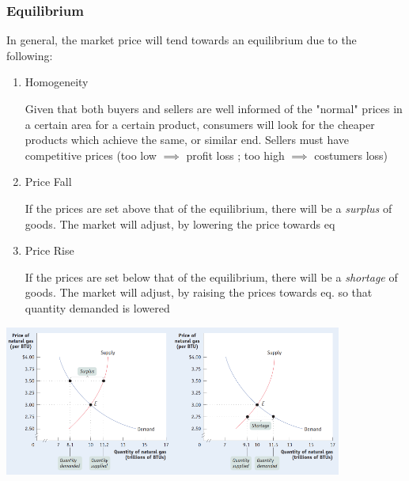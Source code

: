 \documentclass[english,course]{Notes}
\newcommand{\ita}[1]{\textit{#1}}
\begin{document}
\subsubsection{Equilibrium}




\par{In general, the market price will tend towards an equilibrium due to the following:}

\begin{enumerate}

\item Homogeneity

	\par{Given that both buyers and sellers are well informed of the "normal" prices in a certain area for a certain product, consumers will look for the cheaper products which achieve the same, or similar end. Sellers must have competitive prices (too low $\implies$ profit loss ; too high $\implies$ costumers loss)}
	
\item Price Fall

	\par{If the prices are set above that of the equilibrium, there will be a \ita{surplus} of goods. The market will adjust, by lowering the price towards eq}
	
	
\item Price Rise

	\par{If the prices are set below that of the equilibrium, there will be a \ita{shortage} of goods. The market will adjust, by raising the prices towards eq. so that quantity demanded is lowered}
	
\end{enumerate}


\includegraphics[width=15em]{supplySurplus}\includegraphics[width=15em]{supplyShortage}
\end{document}

